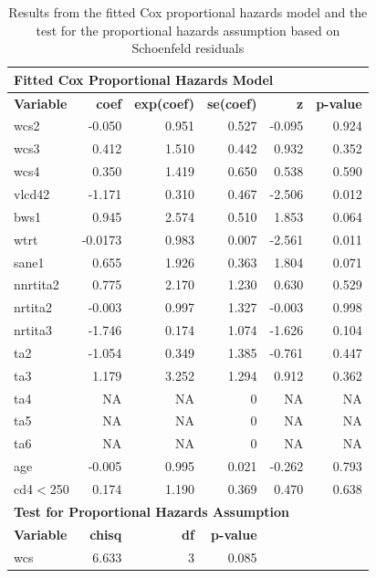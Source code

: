 \documentclass[10pt]{NSP1}
\begin{document}
\begin{table}[H]
    \centering
    \caption{Results from the fitted Cox proportional hazards model and the test for the proportional hazards assumption based on Schoenfeld residuals}
    \label{tab:cox_results}
    \begin{tabular}{l r r r r r}
        \toprule
        \multicolumn{6}{l}{\textbf{Fitted Cox Proportional Hazards Model}} \\
        \midrule
        \textbf{Variable} & \textbf{coef} & \textbf{exp(coef)} & \textbf{se(coef)} & \textbf{z} & \textbf{p-value} \\
        \midrule
        wcs2 & -0.050 & 0.951 & 0.527 & -0.095 & 0.924 \\
        wcs3 & 0.412 & 1.510 & 0.442 & 0.932 & 0.352 \\
        wcs4 & 0.350 & 1.419 & 0.650 & 0.538 & 0.590 \\
        vlcd42 & -1.171 & 0.310 & 0.467 & -2.506 & 0.012 \\
        bws1 & 0.945 & 2.574 & 0.510 & 1.853 & 0.064 \\
        wtrt & -0.0173 & 0.983 & 0.007 & -2.561 & 0.011 \\
        sane1 & 0.655 & 1.926 & 0.363 & 1.804 & 0.071 \\
        nnrtita2 & 0.775 & 2.170 & 1.230 & 0.630 & 0.529 \\
        nrtita2 & -0.003 & 0.997 & 1.327 & -0.003 & 0.998 \\
        nrtita3 & -1.746 & 0.174 & 1.074 & -1.626 & 0.104 \\
        ta2 & -1.054 & 0.349 & 1.385 & -0.761 & 0.447 \\
        ta3 & 1.179 & 3.252 & 1.294 & 0.912 & 0.362 \\
        ta4 & NA & NA & 0 & NA & NA \\
        ta5 & NA & NA & 0 & NA & NA \\
        ta6 & NA & NA & 0 & NA & NA \\
        age& -0.005 & 0.995 & 0.021 & -0.262 & 0.793 \\
        cd4$<$250& 0.174 & 1.190 & 0.369 & 0.470 & 0.638 \\
        \midrule
        \multicolumn{6}{l}{\textbf{Test for Proportional Hazards Assumption}} \\
        \midrule
        \textbf{Variable} & \textbf{chisq} & \textbf{df} & \textbf{p-value} & & \\
        \midrule
        wcs & 6.633 & 3 & 0.085 & & \\

\end{tabular}
\end{table}
\end{document}
